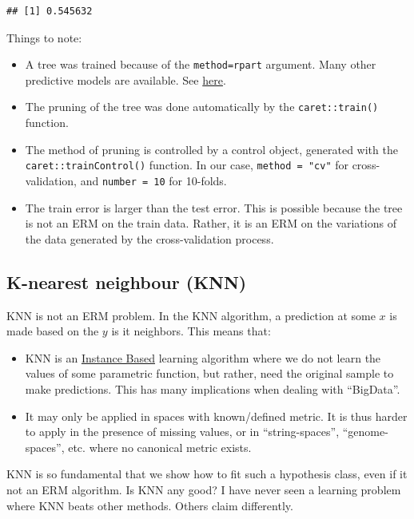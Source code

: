 \documentclass[]{book}
\providecommand{\tightlist}{%
  \setlength{\itemsep}{0pt}\setlength{\parskip}{0pt}}
\theoremstyle{definition}
\theoremstyle{definition}
\theoremstyle{definition}
\theoremstyle{remark}
\begin{document}
\begin{verbatim}
## [1] 0.545632
\end{verbatim}

Things to note:

\begin{itemize}
\tightlist
\item
  A tree was trained because of the
  \texttt{method=\textquotesingle{}rpart\textquotesingle{}} argument.
  Many other predictive models are available. See
  \href{http://topepo.github.io/caret/available-models.html}{here}.
\item
  The pruning of the tree was done automatically by the
  \texttt{caret::train()} function.
\item
  The method of pruning is controlled by a control object, generated
  with the \texttt{caret::trainControl()} function. In our case,
  \texttt{method\ =\ "cv"} for cross-validation, and
  \texttt{number\ =\ 10} for 10-folds.
\item
  The train error is larger than the test error. This is possible
  because the tree is not an ERM on the train data. Rather, it is an ERM
  on the variations of the data generated by the cross-validation
  process.
\end{itemize}

\subsection{K-nearest neighbour (KNN)}\label{k-nearest-neighbour-knn}

KNN is not an ERM problem. In the KNN algorithm, a prediction at some
\(x\) is made based on the \(y\) is it neighbors. This means that:

\begin{itemize}
\tightlist
\item
  KNN is an
  \href{https://en.wikipedia.org/wiki/Instance-based_learning}{Instance
  Based} learning algorithm where we do not learn the values of some
  parametric function, but rather, need the original sample to make
  predictions. This has many implications when dealing with ``BigData''.
\item
  It may only be applied in spaces with known/defined metric. It is thus
  harder to apply in the presence of missing values, or in
  ``string-spaces'', ``genome-spaces'', etc. where no canonical metric
  exists.
\end{itemize}

KNN is so fundamental that we show how to fit such a hypothesis class,
even if it not an ERM algorithm. Is KNN any good? I have never seen a
learning problem where KNN beats other methods. Others claim
differently.
\end{document}
